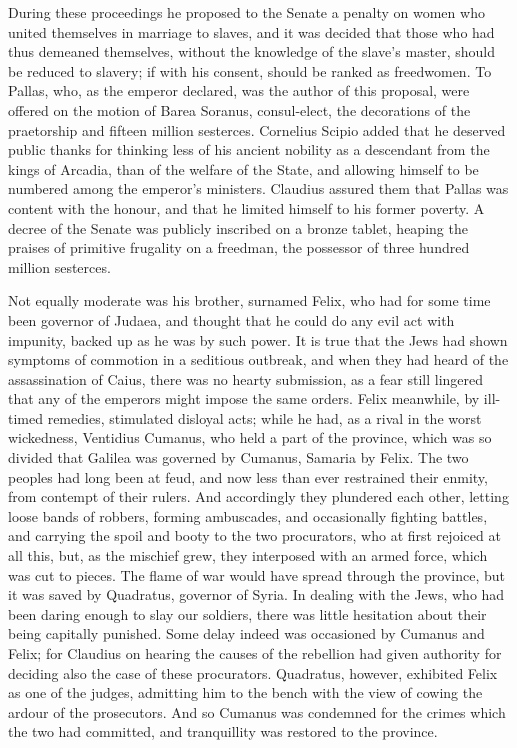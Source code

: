 During these proceedings he proposed to the Senate a penalty on women who united themselves in marriage to slaves, and it was decided that those who had thus demeaned themselves, without the knowledge of the slave's master, should be reduced to slavery; if with his consent, should be ranked as freedwomen. To Pallas, who, as the emperor declared, was the author of this proposal, were offered on the motion of Barea Soranus, consul-elect, the decorations of the praetorship and fifteen million sesterces. Cornelius Scipio added that he deserved public thanks for thinking less of his ancient nobility as a descendant from the kings of Arcadia, than of the welfare of the State, and allowing himself to be numbered among the emperor's ministers. Claudius assured them that Pallas was content with the honour, and that he limited himself to his former poverty. A decree of the Senate was publicly inscribed on a bronze tablet, heaping the praises of primitive frugality on a freedman, the possessor of three hundred million sesterces.


Not equally moderate was his brother, surnamed Felix, who had for some time been governor of Judaea, and thought that he could do any evil act with impunity, backed up as he was by such power. It is true that the Jews had shown symptoms of commotion in a seditious outbreak, and when they had heard of the assassination of Caius, there was no hearty submission, as a fear still lingered that any of the emperors might impose the same orders. Felix meanwhile, by ill-timed remedies, stimulated disloyal acts; while he had, as a rival in the worst wickedness, Ventidius Cumanus, who held a part of the province, which was so divided that Galilea was governed by Cumanus, Samaria by Felix. The two peoples had long been at feud, and now less than ever restrained their enmity, from contempt of their rulers. And accordingly they plundered each other, letting loose bands of robbers, forming ambuscades, and occasionally fighting battles, and carrying the spoil and booty to the two procurators, who at first rejoiced at all this, but, as the mischief grew, they interposed with an armed force, which was cut to pieces. The flame of war would have spread through the province, but it was saved by Quadratus, governor of Syria. In dealing with the Jews, who had been daring enough to slay our soldiers, there was little hesitation about their being capitally punished. Some delay indeed was occasioned by Cumanus and Felix; for Claudius on hearing the causes of the rebellion had given authority for deciding also the case of these procurators. Quadratus, however, exhibited Felix as one of the judges, admitting him to the bench with the view of cowing the ardour of the prosecutors. And so Cumanus was condemned for the crimes which the two had committed, and tranquillity was restored to the province.

